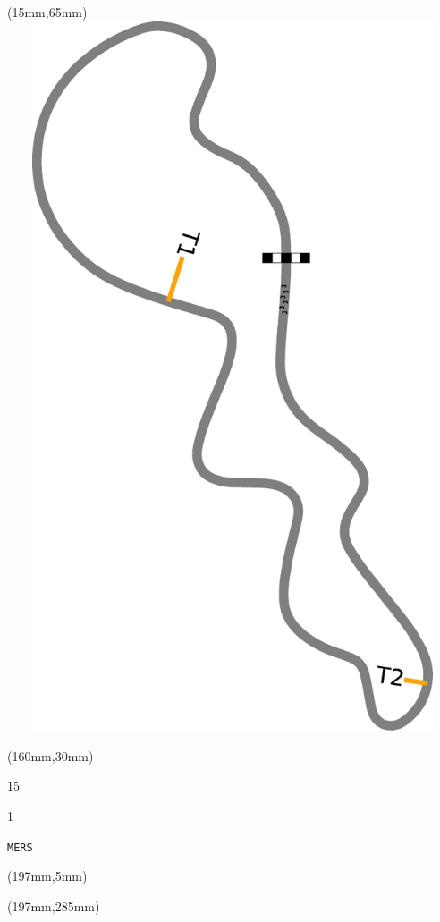 \begin{textblock*}{185mm}(15mm,65mm)%
\centering
\mbox{\includegraphics[width=185mm,height=210mm,keepaspectratio]{PT/MERS.pdf}}
\end{textblock*}
\begin{textblock*}{40mm}(160mm,30mm)%
\Large
\par{} 
\par15 
\par1 
\par\hfill\tiny\tt MERS\\
\end{textblock*}
\begin{textblock*}{20mm}(197mm,5mm)%
\fbox{\thepage}
\label{MERS}
\end{textblock*}
\begin{textblock*}{20mm}(197mm,285mm)%
\fbox{\thepage}
\end{textblock*}

